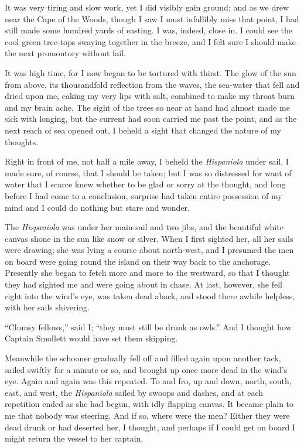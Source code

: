 It was very tiring and slow work, yet I did visibly gain ground; and as we drew near the Cape of the Woods, though I saw I must infallibly miss that point, I had still made some hundred yards of easting. I was, indeed, close in. I could see the cool green tree-tops swaying together in the breeze, and I felt sure I should make the next promontory without fail.

It was high time, for I now began to be tortured with thirst. The glow of the sun from above, its thousandfold reflection from the waves, the sea-water that fell and dried upon me, caking my very lips with salt, combined to make my throat burn and my brain ache. The sight of the trees so near at hand had almost made me sick with longing, but the current had soon carried me past the point, and as the next reach of sea opened out, I beheld a sight that changed the nature of my thoughts.

Right in front of me, not half a mile away, I beheld the \textit{Hispaniola} under sail. I made sure, of course, that I should be taken; but I was so distressed for want of water that I scarce knew whether to be glad or sorry at the thought, and long before I had come to a conclusion, surprise had taken entire possession of my mind and I could do nothing but stare and wonder.

The \textit{Hispaniola} was under her main-sail and two jibs, and the beautiful white canvas shone in the sun like snow or silver. When I first sighted her, all her sails were drawing; she was lying a course about north-west, and I presumed the men on board were going round the island on their way back to the anchorage. Presently she began to fetch more and more to the westward, so that I thought they had sighted me and were going about in chase. At last, however, she fell right into the wind’s eye, was taken dead aback, and stood there awhile helpless, with her sails shivering.

\enquote{Clumsy fellows,} said I; \enquote{they must still be drunk as owls.} And I thought how Captain Smollett would have set them skipping.

Meanwhile the schooner gradually fell off and filled again upon another tack, sailed swiftly for a minute or so, and brought up once more dead in the wind’s eye. Again and again was this repeated. To and fro, up and down, north, south, east, and west, the \textit{Hispaniola} sailed by swoops and dashes, and at each repetition ended as she had begun, with idly flapping canvas. It became plain to me that nobody was steering. And if so, where were the men? Either they were dead drunk or had deserted her, I thought, and perhaps if I could get on board I might return the vessel to her captain.

